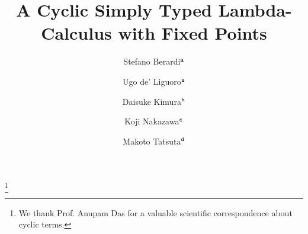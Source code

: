 \documentclass[twoside,11pt]{entics}
\begin{document}
\begin{frontmatter}

  \title{A Cyclic Simply Typed Lambda-Calculus with Fixed Points} 
 \thanks[ALL]{We thank Prof. Anupam Das for a valuable scientific correspondence about cyclic terms.}   %
  \author{Stefano Berardi$^{\tt a}$}	%
   \author{Ugo de' Liguoro$^{\tt a}$}		%
    \author{Daisuke Kimura$^{\tt b}$}
      \author{Koji Nakazawa$^{\tt c}$}
       \author{Makoto Tatsuta$^{\tt d}$}
   \address[a]{C.S. Dept., Turin University, Torino, Italy}  							
   \address[b]{Department of Information Science, Toho University, Japan} 
   \address[c]{Graduate School of Informatics, Nagoya University, Japan}
   \address[d]{National Institute of Informatics/Sokendai, Tokyo, Japan}
 
 


\end{frontmatter}
\end{document}
